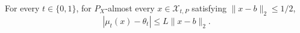 For every \(t\in\{0,1\}\), for \(P_X\)-almost every \(x\in\mathcal X_{t,P}\) satisfying \(\lVert x-b\rVert_2\leq1/2\),
\[
 |\mu_t(x)-\theta_t|\leq L\lVert x-b\rVert_2.
\]